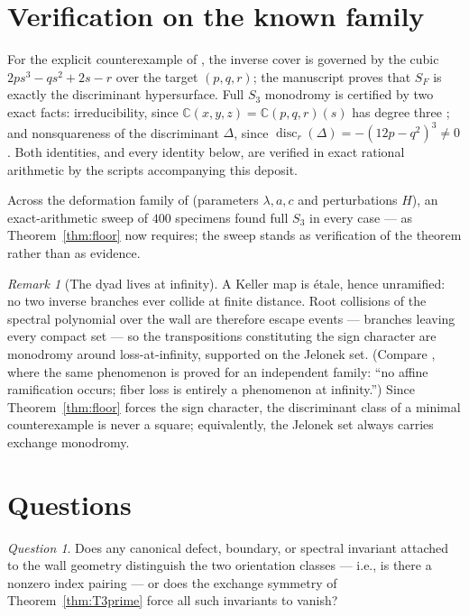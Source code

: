 \documentclass[11pt,reqno]{amsart}
\numberwithin{equation}{section}
\theoremstyle{remark}
\newtheorem{remark}[theorem]{Remark}
\newtheorem{question}[theorem]{Question}
\newcommand{\C}{\mathbb C}
\newcommand{\SF}{S_F}
\begin{document}
\section{Verification on the known family}\label{sec:verification}

For the explicit counterexample of \cite{Alpoge,Counterexample2026}, the
inverse cover is governed by the cubic $2ps^3-qs^2+2s-r$ over the target
$(p,q,r)$; the manuscript proves that $\SF$ is exactly the discriminant
hypersurface. Full $S_3$ monodromy is certified by two exact facts:
irreducibility, since $\C(x,y,z)=\C(p,q,r)(s)$ has degree three
\cite[Rmk.~4.4]{Counterexample2026}; and nonsquareness of the discriminant
$\Delta$, since $\operatorname{disc}_r(\Delta)=-(12p-q^2)^3\neq0$. Both
identities, and every identity below, are verified in exact rational
arithmetic by the scripts accompanying this deposit.

Across the deformation family of \cite[Thm.~5.1]{Counterexample2026}
(parameters $\lambda,a,c$ and perturbations $H$), an exact-arithmetic sweep
of $400$ specimens found full $S_3$ in every case --- as
Theorem~\ref{thm:floor} now requires; the sweep stands as verification of
the theorem rather than as evidence.

\begin{remark}[The dyad lives at infinity]\label{rem:infinity}
A Keller map is \'etale, hence unramified: no two inverse branches ever
collide at finite distance. Root collisions of the spectral polynomial over
the wall are therefore escape events --- branches leaving every compact set
--- so the transpositions constituting the sign character are monodromy
around loss-at-infinity, supported on the Jelonek set. (Compare
\cite{Anumula}, where the same phenomenon is proved for an independent
family: ``no affine ramification occurs; fiber loss is entirely a
phenomenon at infinity.'') Since Theorem~\ref{thm:floor} forces the sign
character, the discriminant class of a minimal counterexample is never a
square; equivalently, the Jelonek set always carries exchange monodromy.
\end{remark}

\section{Questions}\label{sec:questions}

\begin{question}\label{q:index}
Does any canonical defect, boundary, or spectral invariant attached to the
wall geometry distinguish the two orientation classes --- i.e., is there a
nonzero index pairing --- or does the exchange symmetry of
Theorem~\ref{thm:T3prime} force all such invariants to vanish?
\end{question}
\end{document}
